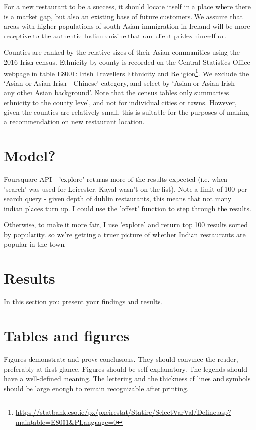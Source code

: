 \documentclass[a4paper,10pt]{article}
\begin{document}
For a new restaurant to be a success, it should locate itself in a place where there is a market gap, but also an existing base of future customers. We assume that areas with higher populations of south Asian immigration in Ireland will be more receptive to the authentic Indian cuisine that our client prides himself on. 

Counties are ranked by the relative sizes of their Asian communities using the 2016 Irish census. Ethnicity by county is recorded on the Central Statistics Office webpage in table E8001: Irish Travellers Ethnicity and Religion\footnote{\url{https://statbank.cso.ie/px/pxeirestat/Statire/SelectVarVal/Define.asp?maintable=E8001&PLanguage=0}}. We exclude the `Asian or Asian Irish - Chinese' category, and select by `Asian or Asian Irish - any other Asian background'. Note that the census tables only summarises ethnicity to the county level, and not for individual cities or towns. However, given the counties are relatively small, this is suitable for the purposes of making a recommendation on new restaurant location.




\section{Model?}

Foursquare API - 'explore' returns more of the results expected (i.e. when 'search' was used for Leicester, Kayal wasn't on the list).
Note a limit of 100 per search query - given depth of dublin restaurants, this means that not many indian places turn up.
I could use the 'offset' function to step through the results.

Otherwise, to make it more fair, I use 'explore' and return top 100 results sorted by popularity. so we're getting a truer picture of whether Indian restaurants are popular in the town.


\section{Results}
In this section you present your findings and results.


\newpage
\section{Tables and figures}
Figures demonstrate and prove conclusions. They should convince 
the reader, preferably at first glance. Figures should be self-explanatory. 
The legends should have a well-defined meaning. The lettering and the 
thickness of lines and symbols should be large enough to remain recognizable 
after printing.
\end{document}
